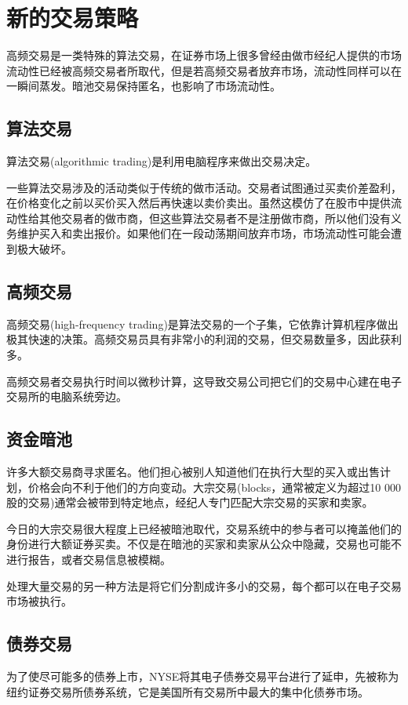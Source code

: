 \documentclass{article}
\begin{document}
\section{新的交易策略}
高频交易是一类特殊的算法交易，在证券市场上很多曾经由做市经纪人提供的市场流动性已经被高频交易者所取代，但是若高频交易者放弃市场，流动性同样可以在一瞬间蒸发。暗池交易保持匿名，也影响了市场流动性。

\subsection{算法交易}
算法交易(algorithmic trading)是利用电脑程序来做出交易决定。

一些算法交易涉及的活动类似于传统的做市活动。交易者试图通过买卖价差盈利，在价格变化之前以买价买入然后再快速以卖价卖出。虽然这模仿了在股市中提供流动性给其他交易者的做市商，但这些算法交易者不是注册做市商，所以他们没有义务维护买入和卖出报价。如果他们在一段动荡期间放弃市场，市场流动性可能会遭到极大破坏。

\subsection{高频交易}
高频交易(high-frequency trading)是算法交易的一个子集，它依靠计算机程序做出极其快速的决策。高频交易员具有非常小的利润的交易，但交易数量多，因此获利多。

高频交易者交易执行时间以微秒计算，这导致交易公司把它们的交易中心建在电子交易所的电脑系统旁边。

\subsection{资金暗池}
许多大额交易商寻求匿名。他们担心被别人知道他们在执行大型的买入或出售计划，价格会向不利于他们的方向变动。大宗交易(blocks，通常被定义为超过10 000股的交易)通常会被带到特定地点，经纪人专门匹配大宗交易的买家和卖家。

今日的大宗交易很大程度上已经被暗池取代，交易系统中的参与者可以掩盖他们的身份进行大额证券买卖。不仅是在暗池的买家和卖家从公众中隐藏，交易也可能不进行报告，或者交易信息被模糊。

处理大量交易的另一种方法是将它们分割成许多小的交易，每个都可以在电子交易市场被执行。

\subsection{债券交易}
为了使尽可能多的债券上市，NYSE将其电子债券交易平台进行了延申，先被称为纽约证券交易所债券系统，它是美国所有交易所中最大的集中化债券市场。
\end{document}
